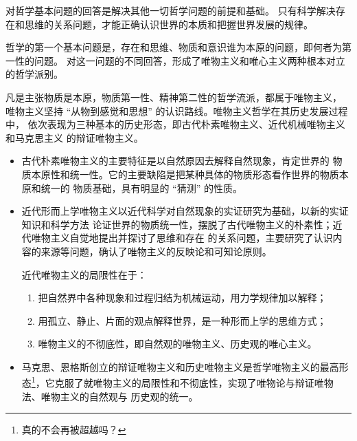 \documentclass[11pt, UTF8]{book} %
\begin{document}
对哲学基本问题的回答是解决其他一切哲学问题的前提和基础。
只有科学解决存在和思维的关系问题，才能正确认识世界的本质和把握世界发展的规律。

{\small
\begin{mdframed}[frametitle={哲学的基本问题及其派别分类}]
    \quad\quad 哲学的第一个基本问题是，存在和思维、物质和意识谁为本原的问题，即何者为第一性的问题。
    对这一问题的不同回答，形成了唯物主义和唯心主义两种根本对立的哲学派别。
    
    
    凡是主张物质是本原，物质第一性、精神第二性的哲学流派，都属于唯物主义，
    唯物主义坚持 “从物到感觉和思想” 的认识路线。唯物主义哲学在其历史发展过程中，
    依次表现为三种基本的历史形态，即古代朴素唯物主义、近代机械唯物主义和马克思主义
    的辩证唯物主义。
    \begin{itemize}[itemsep=0pt]
        \item 古代朴素唯物主义的主要特征是以自然原因去解释自然现象，肯定世界的
        物质本原性和统一性。它的主要缺陷是把某种具体的物质形态看作世界的物质本原和统一的
        物质基础，具有明显的 “猜测” 的性质。
        \item 近代形而上学唯物主义以近代科学对自然现象的实证研究为基础，以新的实证知识和科学方法
        论证世界的物质统一性，摆脱了古代唯物主义的朴素性；近代唯物主义自觉地提出并探讨了思维和存在
        的关系问题，主要研究了认识内容的来源等问题，确认了唯物主义的反映论和可知论原则。
    
        近代唯物主义的局限性在于：
        \begin{enumerate}[label={${\arabic*}^\circ$}, itemsep=0pt]
            \item 把自然界中各种现象和过程归结为机械运动，用力学规律加以解释；
            \item 用孤立、静止、片面的观点解释世界，是一种形而上学的思维方式；
            \item 唯物主义的不彻底性，即自然观的唯物主义、历史观的唯心主义。
        \end{enumerate}
        \item 马克思、恩格斯创立的辩证唯物主义和历史唯物主义是哲学唯物主义的最高形态\footnote{
            真的不会再被超越吗？
        }，它克服了就唯物主义的局限性和不彻底性，实现了唯物论与辩证唯物法、唯物主义的自然观与
        历史观的统一。
    \end{itemize}
    

\end{mdframed}}
\end{document}
